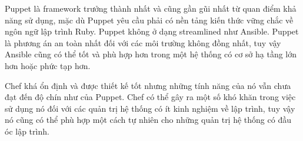 Puppet là framework trưởng thành nhất và cũng gần gũi nhất từ quan điểm khả năng sử dụng, mặc dù Puppet yêu cầu phải có nền tảng kiến thức vững chắc về ngôn ngữ lập trình Ruby. Puppet không ở dạng streamlined như Ansible. Puppet là phương án an toàn nhất đối với các môi trường không đồng nhất, tuy vậy Ansible cũng có thể tốt và phù hợp hơn trong một hệ thống có cơ sở hạ tầng lớn hơn hoặc phức tạp hơn.

Chef khá ổn định và được thiết kế tốt nhưng những tính năng của nó vẫn chưa đạt đến độ chín như của Puppet. Chef có thể gây ra một số khó khăn trong việc sử dụng nó đối với các quản trị hệ thống có ít kinh nghiệm về lập trình, tuy vậy nó cũng có thể phù hợp một cách tự nhiên cho những quản trị hệ thống có đầu óc lập trình.

\newpage
\clearpage

